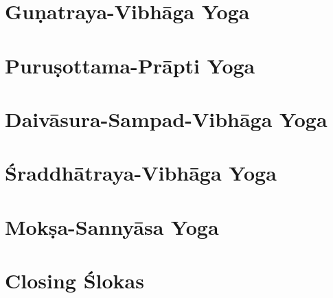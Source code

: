 \documentclass[headings=small]{scrbook}
\begin{document}
\chapter{Guṇatraya-Vibhāga Yoga}


\chapter{Puruṣottama-Prāpti Yoga}


\chapter{Daivāsura-Sampad-Vibhāga Yoga}


\chapter{Śraddhātraya-Vibhāga Yoga}


\chapter{Mokṣa-Sannyāsa Yoga}


\backmatter
\chapter{Closing Ślokas}

\end{document}
